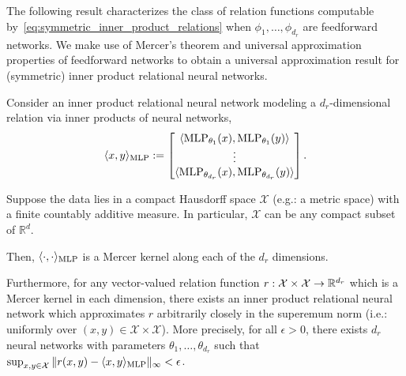 The following result characterizes the class of relation functions computable by~\eqref{eq:symmetric_inner_product_relations} when \(\phi_{1}, \ldots, \phi_{d_r}\) are feedforward networks. We make use of Mercer's theorem and universal approximation properties of feedforward networks to obtain a universal approximation result for (symmetric) inner product relational neural networks.


\begin{thm}
	\label{theorem:function_class_inner_product_relnn}
	\hphantom{~}

	Consider an inner product relational neural network modeling a \(d_r\)-dimensional relation via inner products of neural networks,
	\begin{equation*}
		\langle x, y \rangle_{\text{MLP}} := \begin{bmatrix}\langle \text{MLP}_{\theta_1}(x), \text{MLP}_{\theta_1}(y) \rangle \\ \vdots \\ \langle \text{MLP}_{\theta_{d_r}}(x), \text{MLP}_{\theta_{d_r}}(y) \rangle\end{bmatrix}.
	\end{equation*}

	Suppose the data lies in a compact Hausdorff space \(\mathcal{X}\) (e.g.: a metric space) with a finite countably additive measure. In particular, \(\mathcal{X}\) can be any compact subset of \(\mathbb{R}^d\).

	Then, \(\langle \cdot, \cdot \rangle_{\text{MLP}}\) is a Mercer kernel along each of the \(d_r\) dimensions.

	Furthermore, for any vector-valued relation function \(r: \mathcal{X} \times \mathcal{X} \to \mathbb{R}^{d_r}\) which is a Mercer kernel in each dimension, there exists an inner product relational neural network which approximates \(r\) arbitrarily closely in the superemum norm (i.e.: uniformly over \((x,y) \in \mathcal{X}\times\mathcal{X}\)). More precisely, for all \(\epsilon > 0\), there exists \(d_r\) neural networks with parameters \(\theta_1, \ldots, \theta_{d_r}\) such that \(\sup_{x,y \in \mathcal{X}}{\lVert r(x,y) - \langle x, y \rangle_{\text{MLP}} \rVert_\infty} < \epsilon\).
\end{thm}

